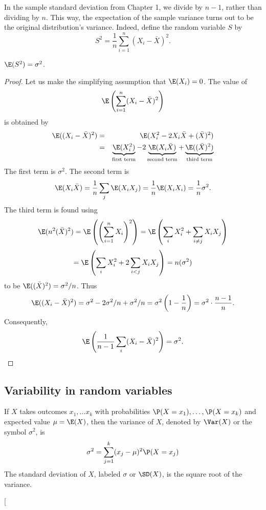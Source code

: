 In the sample standard deviation from Chapter 1, we divide by $n-1$, rather than dividing by $n$. This way, the expectation of the sample variance turns out to be the original distribution's variance. Indeed, define the random variable $S$ by
\[
	S^2 = \frac1n \sum_{i=1}^n (X_i-\bar X)^2.
\]
\begin{thm}
$\E(S^2)=\sigma^2$.
\end{thm}
\begin{proof}
Let us make the simplifying assumption that $\E(X_i)=0$.
The value of
\[
	\E\left (\sum_{i=1}^n (X_i-\bar X)^2\right)
\]
is obtained by
\begin{eqnarray*}
	\E((X_i-\bar X)^2) &=& \E(X_i^2-2X_i\bar X + (\bar X)^2)\\
	&=& \underbrace{\E(X_i^2)}_{\text{first term}}-2\underbrace{\E(X_i\bar X)}_{\text{second term}} + \underbrace{\E((\bar X)^2)}_{\text{third term}}
\end{eqnarray*}
The first term is $\sigma^2$.
The second term is
\[
\E(X_i\bar X) = \frac1n \sum_j \E(X_iX_j) = \frac1n \E(X_iX_i) = \frac1n \sigma^2.
\]
The third term is found using
\[
	\E(n^2(\bar X)^2) = \E\left (\left (\sum_{i=1}^n X_i\right )^2\right) = \E\left (\sum_i X_i^2 + \sum_{i\ne j} X_iX_j\right)
\]
\[
	= \E\left (\sum_i X_i^2 + 2\sum_{i<j} X_iX_j\right ) = n(\sigma^2)
\]
to be $\E((\bar X)^2) = \sigma^2/n$. Thus
\begin{eqnarray*}
	\E((X_i-\bar X)^2) %
	= \sigma^2-2\sigma^2/n + \sigma^2/n = \sigma^2\left(1-\frac1n\right) = \sigma^2\cdot\frac{n-1}n.
\end{eqnarray*}
Consequently,
\[
\E\left(\frac1{n-1}\sum_i (X_i-\bar X)^2\right) = \sigma^2.\qedhere
\]
\end{proof}

\subsection{Variability in random variables}

\begin{termBox}{
If $X$ takes outcomes $x_1,\dots x_k$ with probabilities $\P(X=x_1),\dots, \P(X=x_k)$ and expected value $\mu=\E(X)$, then the variance of $X$, denoted by $\Var(X)$ or the symbol $\sigma^2$, is
\[
\sigma^2 = \sum_{j=1}^{k} (x_j - \mu)^2 \P(X=x_j)
\]
The standard deviation of $X$, labeled $\sigma$ or $\SD(X)$, is the square root of the variance.}
\end{termBox}
\marginpar[\raggedright\vspace{-47mm}

